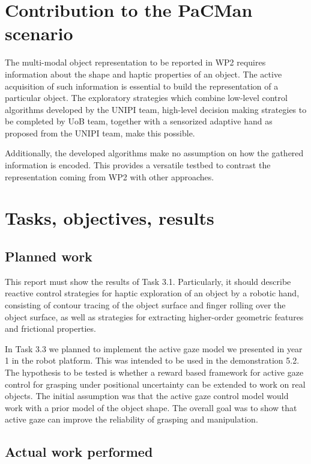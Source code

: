 \documentclass[a4paper,11pt,pdf]{pacmanreport}
\begin{document}
\section*{Contribution to the PaCMan scenario}

The multi-modal object representation to be reported in WP2 requires information about the shape and haptic properties of an object.
The active acquisition of such information is essential to build the representation of a particular object. The exploratory strategies which combine low-level control algorithms developed by the UNIPI team, high-level decision making strategies to be completed by UoB team, together with a sensorized adaptive hand as proposed from the UNIPI team, make this possible.

Additionally, the developed algorithms make no assumption on how the gathered information is encoded. This provides a versatile testbed to contrast the representation coming from WP2 with other approaches.

\newpage

\section{Tasks, objectives, results}

\subsection{Planned work}

This report must show the results of Task 3.1. Particularly, it should describe reactive control strategies for haptic exploration of an object by a robotic hand, consisting of contour tracing of the object surface and finger rolling over the object surface, as well as strategies for extracting higher-order geometric features and frictional properties.

In Task 3.3 we planned to implement the active gaze model we presented in year 1 in the robot platform. This was intended to be used in the demonstration 5.2. The hypothesis to be tested is whether a reward based framework for active gaze control for grasping under positional uncertainty can be extended to work on real objects. The initial assumption was that the active gaze control model would work with a prior model of the object shape. The overall goal was to show that active gaze can improve the reliability of grasping and manipulation.

\subsection{Actual work performed}
\end{document}
